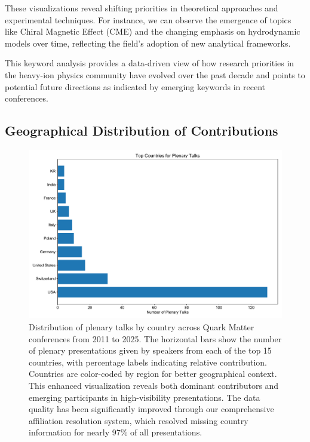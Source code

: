 \documentclass[a4paper,11pt]{article}
\begin{document}
These visualizations reveal shifting priorities in theoretical approaches and experimental techniques. For instance, we can observe the emergence of topics like Chiral Magnetic Effect (CME) and the changing emphasis on hydrodynamic models over time, reflecting the field's adoption of new analytical frameworks.

This keyword analysis provides a data-driven view of how research priorities in the heavy-ion physics community have evolved over the past decade and points to potential future directions as indicated by emerging keywords in recent conferences.

\subsection{Geographical Distribution of Contributions}

\begin{figure}[H]
\centering
\includegraphics[width=\textwidth]{figures/plenary_talks_by_country.pdf}
\caption{Distribution of plenary talks by country across Quark Matter conferences from 2011 to 2025. The horizontal bars show the number of plenary presentations given by speakers from each of the top 15 countries, with percentage labels indicating relative contribution. Countries are color-coded by region for better geographical context. This enhanced visualization reveals both dominant contributors and emerging participants in high-visibility presentations. The data quality has been significantly improved through our comprehensive affiliation resolution system, which resolved missing country information for nearly 97\% of all presentations.}
\label{fig:country_plenary}
\end{figure}
\end{document}
